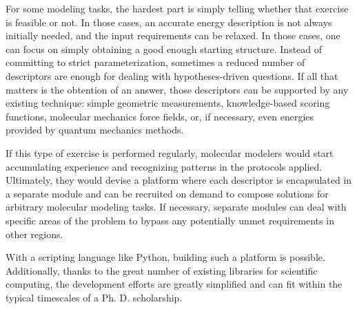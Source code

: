 For some modeling tasks, the hardest part is simply telling whether that exercise is feasible or not. In those cases, an accurate energy description is not always initially needed, and the input requirements can be relaxed. In those cases, one can focus on simply obtaining a good enough starting structure. Instead of committing to strict parameterization, sometimes a reduced number of descriptors are enough for dealing with hypotheses-driven questions. If all that matters is the obtention of an answer, those descriptors can be supported by any existing technique: simple geometric measurements, knowledge-based scoring functions, molecular mechanics force fields, or, if necessary, even energies provided by quantum mechanics methods.

If this type of exercise is performed regularly, molecular modelers would start accumulating experience and recognizing patterns in the protocols applied. Ultimately, they would devise a platform where each descriptor is encapsulated in a separate module and can be recruited on demand to compose solutions for arbitrary molecular modeling tasks. If necessary, separate modules can deal with specific areas of the problem to bypass any potentially unmet requirements in other regions.

With a scripting language like Python, building such a platform is possible. Additionally, thanks to the great number of existing libraries for scientific computing, the development efforts are greatly simplified and can fit within the typical timescales of a Ph. D. scholarship.